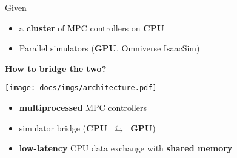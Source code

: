 \bigskip
\Large{
\centering Given
\begin{itemize}
	\item[\themarker] a \textbf{cluster} of MPC controllers on \textbf{CPU}
	\item[\themarker] Parallel simulators (\textbf{GPU}, Omniverse IsaacSim)
\end{itemize}
\vskip1cm
\centering
\textbf{How to bridge the two?}
\vskip1cm	
}
\centering
\texttt{[image: docs/imgs/architecture.pdf]}
\vskip1cm
\begin{itemize}
	\item[\themarker] \textbf{multiprocessed} MPC controllers
	\item[\themarker] simulator bridge (\textbf{CPU~$\leftrightarrows$~GPU})
	\item[\themarker] \textbf{low-latency} CPU data exchange with \textbf{shared memory}
\end{itemize}
\bigskip